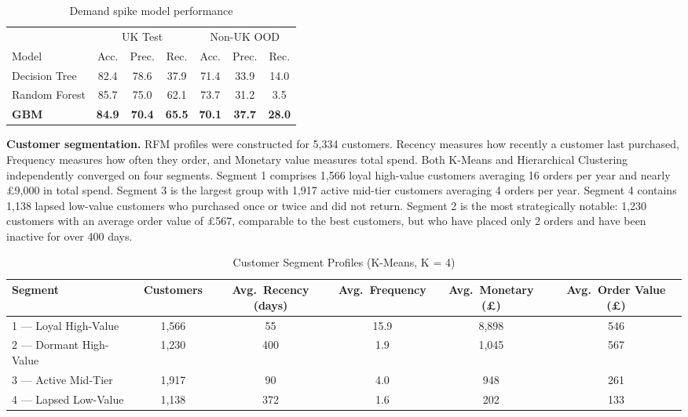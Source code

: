 \documentclass[10pt,a4paper]{article}
\begin{document}
\begin{table}[H]
\centering
\caption{Demand spike model performance}
\footnotesize
\begin{tabular}{lcccccc}
\toprule
& \multicolumn{3}{c}{UK Test} & \multicolumn{3}{c}{Non-UK OOD} \\
\cmidrule(lr){2-4}\cmidrule(lr){5-7}
Model & Acc. & Prec. & Rec. & Acc. & Prec. & Rec. \\
\midrule
Decision Tree & 82.4 & 78.6 & 37.9 & 71.4 & 33.9 & 14.0 \\
Random Forest & 85.7 & 75.0 & 62.1 & 73.7 & 31.2 & 3.5 \\
\textbf{GBM} & \textbf{84.9} & \textbf{70.4} & \textbf{65.5} & \textbf{70.1} & \textbf{37.7} & \textbf{28.0} \\
\bottomrule
\end{tabular}
\end{table}

\textbf{Customer segmentation.} RFM profiles were constructed for 5,334 customers. Recency measures how recently a customer last purchased, Frequency measures how often they order, and Monetary value measures total spend. Both K-Means and Hierarchical Clustering independently converged on four segments. Segment 1 comprises 1,566 loyal high-value customers averaging 16 orders per year and nearly \pounds9,000 in total spend. Segment 3 is the largest group with 1,917 active mid-tier customers averaging 4 orders per year. Segment 4 contains 1,138 lapsed low-value customers who purchased once or twice and did not return. Segment 2 is the most strategically notable: 1,230 customers with an average order value of \pounds567, comparable to the best customers, but who have placed only 2 orders and have been inactive for over 400 days.

\begin{table}[H]
\centering
\caption{Customer Segment Profiles (K-Means, K = 4)}
\footnotesize
\begin{tabular}{lccccc}
\toprule
Segment & Customers & Avg.\ Recency (days) & Avg.\ Frequency & Avg.\ Monetary (\pounds) & Avg.\ Order Value (\pounds) \\
\midrule
1 — Loyal High-Value    & 1,566 & 55  & 15.9 & 8,898 & 546 \\
2 — Dormant High-Value  & 1,230 & 400 & 1.9  & 1,045 & 567 \\
3 — Active Mid-Tier     & 1,917 & 90  & 4.0  & 948   & 261 \\
4 — Lapsed Low-Value    & 1,138 & 372 & 1.6  & 202   & 133 \\
\bottomrule
\end{tabular}
\end{table}
\end{document}
